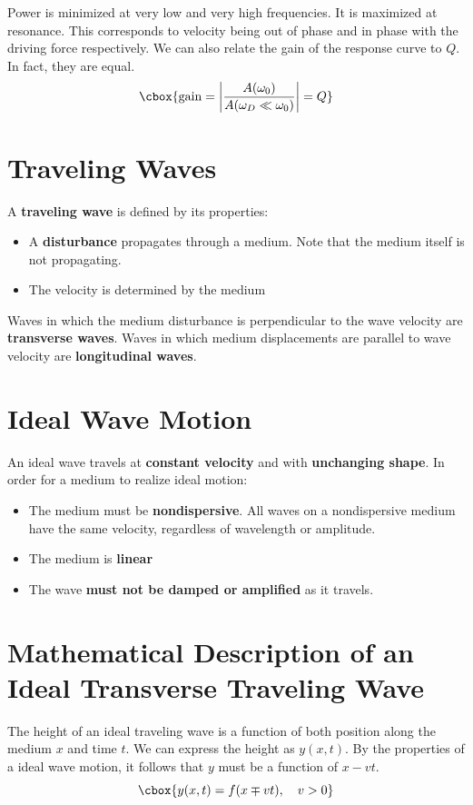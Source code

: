\documentclass{hw}
\renewcommand\emph[1]{{\bf\color{BlueViolet}#1}}
\begin{document}
Power is minimized at very low and very high frequencies. It is maximized at
resonance. This corresponds to velocity being out of phase and in phase with
the driving force respectively. We can also relate the gain of the response
curve to $Q$. In fact, they are equal.
\[\cbox{
  \text{gain} = \left| \frac{A(\omega_0)}{A(\omega_D \ll \omega_0)} \right| = Q
}\]

\section{Traveling Waves}
A \emph{traveling wave} is defined by its properties:
\begin{itemize}
  \item A \emph{disturbance} propagates through a medium. Note that the medium
    itself is not propagating.
  \item The velocity is determined by the medium
\end{itemize}
Waves in which the medium disturbance is perpendicular to the wave velocity are
\emph{transverse waves}. Waves in which medium displacements are parallel to
wave velocity are \emph{longitudinal waves}.

\section{Ideal Wave Motion}
An ideal wave travels at \emph{constant velocity} and with \emph{unchanging
shape}. In order for a medium to realize ideal motion:
\begin{itemize}
  \item The medium must be \emph{nondispersive}. All waves on a nondispersive
    medium have the same velocity, regardless of wavelength or amplitude. 
  \item The medium is \emph{linear}
  \item The wave \emph{must not be damped or amplified} as it travels.
\end{itemize}

\section{Mathematical Description of an Ideal Transverse Traveling Wave}
The height of an ideal traveling wave is a function of both position along the
medium $x$ and time $t$. We can express the height as $y(x,t)$. By the
properties of a ideal wave motion, it follows that $y$ must be a function of $x
- vt$.
\[\cbox{
  y(x, t) = f(x \mp vt), \quad v > 0
}\]
\end{document}
